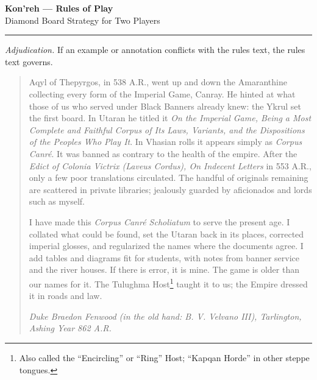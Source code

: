 \documentclass[11pt]{article}
\begin{document}
\clearpage
{}
\begin{center}
{\LARGE \textbf{Kon'reh --- Rules of Play}}\\[2pt]
{\small Diamond Board Strategy for Two Players}
\end{center}
\hrule
\vspace{4pt}

\noindent\footnotesize\textit{Adjudication.} If an example or annotation conflicts with the rules text, the rules text governs.
\normalsize

\begin{quote}\small
Aqyl of Thepyrgos, in 538 A.R., went up and down the Amaranthine collecting every form of the Imperial Game, Canray. He hinted at what those of us who served under Black Banners already knew: the Ykrul set the first board. In Utaran he titled it \emph{On the Imperial Game, Being a Most Complete and Faithful Corpus of Its Laws, Variants, and the Dispositions of the Peoples Who Play It}. In Vhasian rolls it appears simply as \emph{Corpus Canré}. It was banned as contrary to the health of the empire. After the \emph{Edict of Colonia Victrix (Laveus Cordus), On Indecent Letters} in 553 A.R., only a few poor translations circulated. The handful of originals remaining are scattered in private libraries; jealously guarded by aficionados and lords such as myself.

I have made this \emph{Corpus Canré Scholiatum} to serve the present age. I collated what could be found, set the Utaran back in its places, corrected imperial glosses, and regularized the names where the documents agree. I add tables and diagrams fit for students, with notes from banner service and the river houses. If there is error, it is mine. The game is older than our names for it. The Tulughma Host\footnote{Also called the ``Encircling'' or ``Ring'' Host; ``Kapqan Horde'' in other steppe tongues.} taught it to us; the Empire dressed it in roads and law.

\hfill\emph{Duke Braedon Fenwood (in the old hand: B. V. Velvano III), Tarlington, Ashing Year 862 A.R.}
\end{quote}

\medskip

\end{document}
